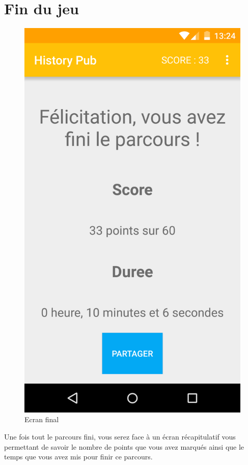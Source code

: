 \documentclass[11pt]{scrreprt}
\begin{document}
    \section{Fin du jeu}
    \begin{figure}[H]
        \centering
        \includegraphics[scale=.15]{images/final.png}
        \caption{Ecran final}
    \end{figure}

    Une fois tout le parcours fini, vous serez face à un écran récapitulatif vous permettant de savoir le nombre de points que vous avez marqués ainsi que le temps que vous avez mis pour finir ce parcours.\\
\end{document}
